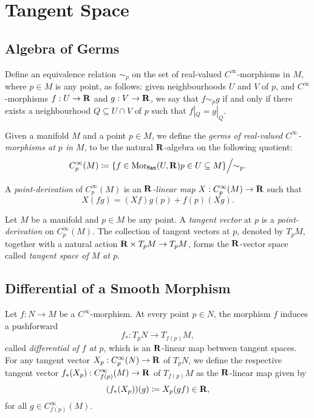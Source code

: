 \section{Tangent Space}

\subsection{Algebra of Germs}

Define an equivalence relation \(\sim_p\) on the set of real-valued
\(C^{\infty}\)-morphisms in \(M\), where \(p \in M\) is any point, as follows:
given neighbourhoods \(U\) and \(V\) of \(p\), and \(C^{\infty}\)-morphisms
\(f: U \to \mathbf{R}\) and \(g: V \to \mathbf{R}\), we say that \(f \sim_p g\) if and only if
there exists a neighbourhood \(Q \subseteq U \cap V\) of \(p\) such that
\(f|_Q = g|_Q\).

\begin{definition}
\label{def:algebra-of-germs-manifold}
Given a manifold \(M\) and a point \(p \in M\), we define the \emph{germs of
  real-valued \(C^{\infty}\)-morphisms at \(p\) in \(M\)}, to be the natural
\(\mathbf{R}\)-algebra on the following quotient:
\[
C_p^{\infty}(M) \coloneq
\{f \in \operatorname{Mor}_{{\texttt{Man}}}(U, \mathbf{R}) \relax p \in U \subseteq M\}
\Big/{\sim_p}.
\]

A \emph{point-derivation} of \(C_p^{\infty}(M)\) is an \emph{\(\mathbf{R}\)-linear map}
\(X: C_p^{\infty}(M) \to \mathbf{R}\) such that
\[
X(f g) = (X f) g(p) + f(p) (X g).
\]
\end{definition}

\begin{definition}
\label{def:tangent-vector-at-point-manifold}
Let \(M\) be a manifold and \(p \in M\) be any point. A \emph{tangent vector} at
\(p\) is a \emph{point-derivation} on \(C_p^{\infty}(M)\). The collection of
tangent vectors at \(p\), denoted by \(T_p M\), together with a natural action
\(\mathbf{R} \times T_p M \to T_p M\), forms the \(\mathbf{R}\)-vector space called
\emph{tangent space of \(M\) at \(p\)}.
\end{definition}

\subsection{Differential of a Smooth Morphism}

\begin{definition}
\label{def:differential-at-a-point}
Let \(f: N \to M\) be a \(C^{\infty}\)-morphism. At every point \(p \in N\), the
morphism \(f\) induces a pushforward
\[
f_{*}: T_p N \longrightarrow T_{f(p)} M,
\]
called \emph{differential of \(f\) at \(p\)}, which is an \(\mathbf{R}\)-linear map
between tangent spaces. For any tangent vector \(X_p: C_p^{\infty}(N) \to \mathbf{R}\) of
\(T_p N\), we define the respective tangent vector
\(f_{*}(X_p): C_{f(p)}^{\infty}(M) \to \mathbf{R}\) of \(T_{f(p)} M\) as the
\(\mathbf{R}\)-linear map given by
\[
(f_{*}(X_p))(g) \coloneq X_p(g f) \in \mathbf{R},
\]
for all \(g \in C_{f(p)}^{\infty}(M)\).
\end{definition}

